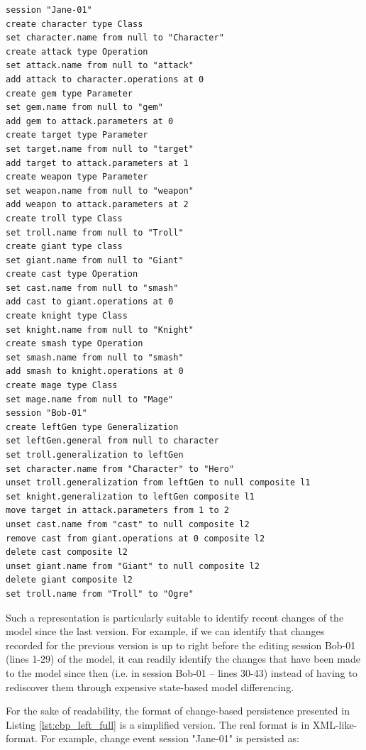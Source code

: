 \vspace{-20pt}
\begin{lstlisting}[style=eol,escapechar=|,caption={The complete version of Bob's change events in Listing \ref{lst:cbp_left}.},label=lst:cbp_left_full]
session "Jane-01"
create character type Class
set character.name from null to "Character" 
create attack type Operation
set attack.name from null to "attack" 
add attack to character.operations at 0
create gem type Parameter
set gem.name from null to "gem" 
add gem to attack.parameters at 0
create target type Parameter
set target.name from null to "target" 
add target to attack.parameters at 1
create weapon type Parameter
set weapon.name from null to "weapon" 
add weapon to attack.parameters at 2
create troll type Class
set troll.name from null to "Troll" 
create giant type class
set giant.name from null to "Giant"
create cast type Operation
set cast.name from null to "smash"
add cast to giant.operations at 0
create knight type Class
set knight.name from null to "Knight"
create smash type Operation
set smash.name from null to "smash"
add smash to knight.operations at 0
create mage type Class
set mage.name from null to "Mage" 
session "Bob-01"
create leftGen type Generalization
set leftGen.general from null to character
set troll.generalization to leftGen
set character.name from "Character" to "Hero"
unset troll.generalization from leftGen to null composite l1
set knight.generalization to leftGen composite l1
move target in attack.parameters from 1 to 2
unset cast.name from "cast" to null composite l2
remove cast from giant.operations at 0 composite l2
delete cast composite l2
unset giant.name from "Giant" to null composite l2
delete giant composite l2
set troll.name from "Troll" to "Ogre"
\end{lstlisting}

Such a representation is particularly suitable to identify recent changes of the model since the last version. For example, if we can identify that changes recorded for the previous version is up to right before the editing session \textsf{Bob-01} (lines 1-29) of the model, it can readily identify the changes that have been made to the model since then (i.e. in session \textsf{Bob-01} -- lines 30-43) instead of having to rediscover them through expensive state-based model differencing.

For the sake of readability, the format of change-based persistence presented in Listing \ref{lst:cbp_left_full} is a simplified version. The real format is in XML-like-format. For example, change event \textsf{session "Jane-01"} is persisted as:

